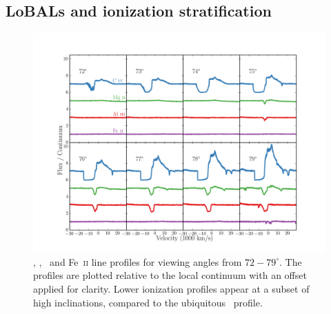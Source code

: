 \documentclass[useAMS,usenatbib]{mn2e_x}
\begin{document}
\subsection{LoBALs and ionization stratification}

\begin{figure} %
\centering
\includegraphics[width=1.0\textwidth]{figures/c4_angles.png}
\caption
{
\civ , \mg , \al\ and Fe~\textsc{ii} line profiles for viewing angles
from $72-79^\circ$. The profiles are plotted relative to the local
continuum with an offset applied for clarity. Lower ionization
profiles appear at a subset of high inclinations, compared
to the ubiquitous \civ\ profile.
}
\label{fig:lobal}
\end{figure} %
\end{document}
